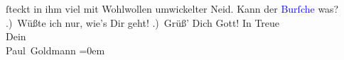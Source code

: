                ſteckt in ihm viel mit Wohlwollen umwickelter Neid. Kann der \textcolor{blue}{Burſche}{} was?\pend
           .) Wüßte ich nur, {\pb} wie’s Dir geht!\pend
           .) Grüß’ Dich Gott!\pend
           \pstart
           In Treue {\\[\baselineskip]}Dein {\\[\baselineskip]}\spacefill\mbox{Paul Goldmann}\pend
           \leftskip=0em{}\endnumbering{}  
      